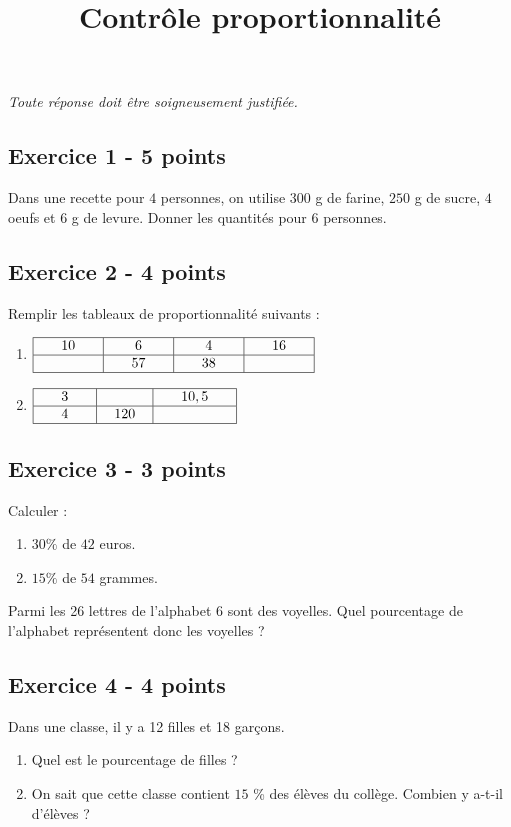 \documentclass[14 pt]{extarticle}
\title{Contrôle proportionnalité}
\date{}
\theoremstyle{plain}
\begin{document}
\emph{Toute réponse doit être soigneusement justifiée.}
 \subsection*{Exercice 1 - 5 points}
 Dans une recette pour $4$ personnes, on utilise $300$ g de farine, $250$ g de sucre, $4$ oeufs et $6$ g de levure. 
 Donner les quantités pour $6$ personnes. 
 \subsection*{Exercice 2 - 4 points}
 Remplir les tableaux de proportionnalité suivants : 
 \begin{enumerate}
 \item 
 $\renewcommand{\arraystretch}{1}
\begin{array}{|c|c|c|c|}
\hline
\phantom{000}10\phantom{000} & \phantom{000}6\phantom{000} & \phantom{000}4\phantom{000}& \phantom{000}16\phantom{000}\\
\hline
\phantom{000}\phantom{000} & \phantom{000}57\phantom{000} & \phantom{000}38\phantom{000}& \phantom{000}\phantom{000}\\
\hline
\end{array}
\renewcommand{\arraystretch}{1}$
\item $\renewcommand{\arraystretch}{1}
\begin{array}{|c|c|c|}
\hline
\phantom{000}3\phantom{000} & \phantom{000}\phantom{000} & \phantom{000}10,5\phantom{000}\\
\hline
4 & 120 & \\
\hline
\end{array}
\renewcommand{\arraystretch}{1}$
 \end{enumerate}
 \subsection*{Exercice 3 - 3 points}
 Calculer : \begin{enumerate}
 \item $30\%$ de $42$ euros. 
 \item $15\%$ de $54$ grammes. 
 \end{enumerate}
 Parmi les 26 lettres de l'alphabet $6$ sont des voyelles. Quel pourcentage de l'alphabet représentent donc les voyelles ?  
 \subsection*{Exercice 4 - 4 points}
Dans une classe, il y  a 12 filles et 18 garçons.
\begin{enumerate}
\item  Quel est le pourcentage de filles ?
\item On sait que cette classe contient $15$ \% des élèves du collège. Combien y a-t-il d'élèves ? 
\end{enumerate}
\end{document}
